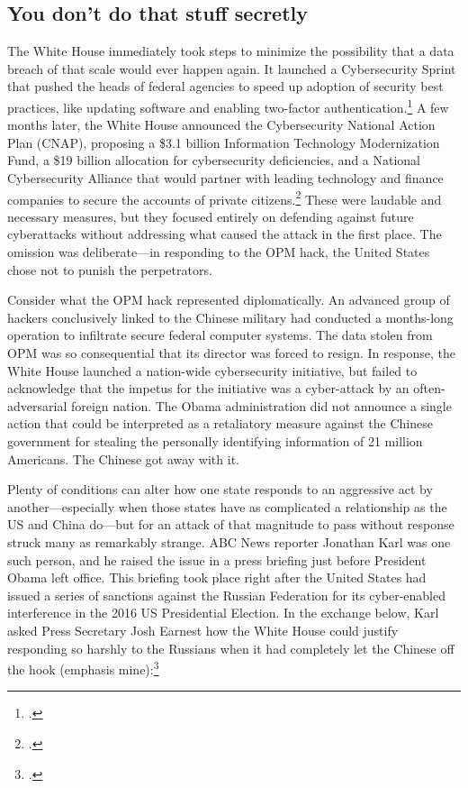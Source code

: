 \documentclass[11pt]{memoir}
\begin{document}
\begin{refsegment}
\subsection{You don't do that stuff secretly}
The White House immediately took steps to minimize the possibility that a data breach of that scale would ever happen again. It launched a Cybersecurity Sprint that pushed the heads of federal agencies to speed up adoption of security best practices, like updating software and enabling two-factor authentication.\footcite{koerner_inside_2016} A few months later, the White House announced the Cybersecurity National Action Plan (CNAP), proposing a \$3.1 billion Information Technology Modernization Fund, a \$19 billion allocation for cybersecurity deficiencies, and a National Cybersecurity Alliance that would partner with leading technology and finance companies to secure the accounts of private citizens.\footcite{the_white_house_fact_2016} These were laudable and necessary measures, but they focused entirely on defending against future cyberattacks without addressing what caused the attack in the first place. The omission was deliberate---in responding to the OPM hack, the United States chose not to punish the perpetrators.

Consider what the OPM hack represented diplomatically. An advanced group of hackers conclusively linked to the Chinese military had conducted a months-long operation to infiltrate secure federal computer systems. The data stolen from OPM was so consequential that its director was forced to resign. In response, the White House launched a nation-wide cybersecurity initiative, but failed to acknowledge that the impetus for the initiative was a cyber-attack by an often-adversarial foreign nation. The Obama administration did not announce a single action that could be interpreted as a retaliatory measure against the Chinese government for stealing the personally identifying information of 21 million Americans. The Chinese got away with it.

Plenty of conditions can alter how one state responds to an aggressive act by another---especially when those states have as complicated a relationship as the US and China do---but for an attack of that magnitude to pass without response struck many as remarkably strange. ABC News reporter Jonathan Karl was one such person, and he raised the issue in a press briefing just before President Obama left office. This briefing took place right after the United States had issued a series of sanctions against the Russian Federation for its cyber-enabled interference in the 2016 US Presidential Election. In the exchange below, Karl asked Press Secretary Josh Earnest how the White House could justify responding so harshly to the Russians when it had completely let the Chinese off the hook (emphasis mine):\footcite[You can watch the full exchange via video here. It's pretty awkward.]{gill_earnest_2017}


\end{refsegment}
\end{document}
